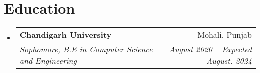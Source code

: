 \documentclass[letterpaper,11pt]{article}
\makeatletter
\newcommand{\resumeSubheading}[4]{
  \vspace{-2pt}\item
    \begin{tabular*}{0.97\textwidth}[t]{l@{\extracolsep{\fill}}r}
      \textbf{#1} & #2 \\
      \textit{\small#3} & \textit{\small #4} \\
    \end{tabular*}\vspace{-7pt}
}
\newcommand{\resumeSubHeadingListStart}{\begin{itemize}[leftmargin=0.15in, label={}]}
\newcommand{\resumeSubHeadingListEnd}{\end{itemize}}
\makeatother
\begin{document}
\section{Education}
  \resumeSubHeadingListStart
    \resumeSubheading
      {Chandigarh University}{Mohali, Punjab}
      {Sophomore, B.E in Computer Science and Engineering}{August 2020 -- Expected August. 2024}
  \resumeSubHeadingListEnd
\end{document}
